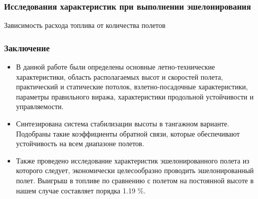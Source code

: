 \documentclass{beamer}
\begin{document}
\begin{frame}[t]
    \frametitle{Исследования характеристик при выполнении эшелонирования}
    \begin{center}
        Зависимость расхода топлива от количества полетов 
        \resizebox{0.7\textwidth}{!}{}
    \end{center}
\end{frame}

\begin{frame}[t]
    \frametitle{Заключение}
    \begin{itemize}
        \item В данной работе были определены основные летно-технические характеристики,
            область располагаемых высот и скоростей полета, практический и статические
            потолок, взлетно-посадочные характеристики, параметры правильного виража, 
            характеристики продольной устойчивости и управляемости.
        \item Синтезирована система стабилизации высоты в тангажном варианте.
            Подобраны такие коэффициенты обратной связи, которые обеспечивают
            устойчивость на всем диапазоне полетов.
        \item Также проведено исследование характеристик эшелонированного полета
            из которого следует, экономически целесообразно проводить
            эшелонированный полет. Выигрыш в топливе по сравнению с полетом на
            постоянной высоте в нашем случае составляет порядка 1.19 \%. 
    \end{itemize}
\end{frame}
\end{document}

